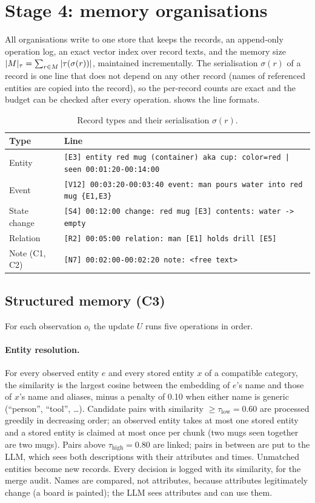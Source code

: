 \section{Stage 4: memory organisations}\label{sec:stage4}

All organisations write to one store that keeps the records, an append-only
operation log, an exact vector index over record texts, and the memory size
$\lvert M \rvert_{\tau}=\sum_{r\in M}|\tau(\sigma(r))|$, maintained incrementally. The
serialisation $\sigma(r)$ of a record is one line that does not depend on any
other record (names of referenced entities are copied into the record), so the
per-record counts are exact and the budget can be checked after every
operation.  shows the line formats.

\begin{table}[ht]
\centering\small
\caption{Record types and their serialisation $\sigma(r)$.}\label{tab:record-lines}
\begin{tabularx}{\linewidth}{@{}lX@{}}
\toprule
Type & Line \\
\midrule
Entity & \texttt{[E3] entity red mug (container) aka cup: color=red | seen 00:01:20-00:14:00} \\
Event & \texttt{[V12] 00:03:20-00:03:40 event: man pours water into red mug \{E1,E3\}} \\
State change & \texttt{[S4] 00:12:00 change: red mug [E3] contents: water -> empty} \\
Relation & \texttt{[R2] 00:05:00 relation: man [E1] holds drill [E5]} \\
Note (C1, C2) & \texttt{[N7] 00:02:00-00:02:20 note: <free text>} \\
\bottomrule
\end{tabularx}
\end{table}

\subsection{Structured memory (C3)}
For each observation $o_i$ the update $U$ runs five operations in order.

\paragraph{Entity resolution.}
For every observed entity $e$ and every stored entity $x$ of a compatible
category, the similarity is the largest cosine between the embedding of $e$'s
name and those of $x$'s name and aliases, minus a penalty of 0.10 when either
name is generic (``person'', ``tool'', \dots). Candidate pairs with similarity
$\ge\tau_{\mathrm{low}}=0.60$ are processed greedily in decreasing order; an
observed entity takes at most one stored entity and a stored entity is claimed
at most once per chunk (two mugs seen together are two mugs). Pairs above
$\tau_{\mathrm{high}}=0.80$ are linked; pairs in between are put to the LLM,
which sees both descriptions with their attributes and times. Unmatched
entities become new records. Every decision is logged with its similarity, for
the merge audit. Names are compared, not attributes, because attributes
legitimately change (a board is painted); the LLM sees attributes and can use
them.

